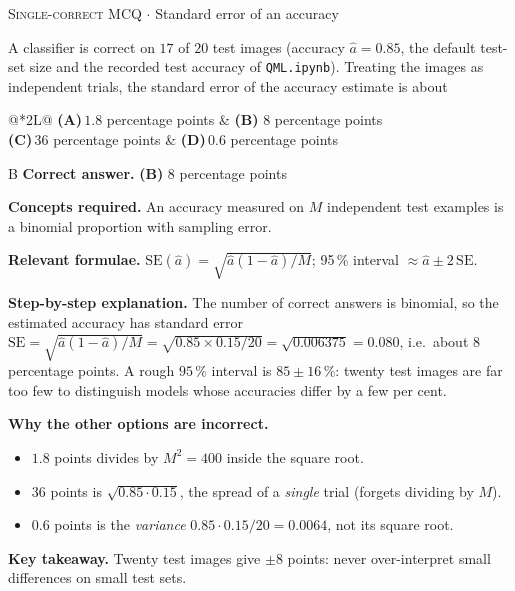 \documentclass[11pt,a4paper]{article}
\newcommand{\optlabel}[1]{\textbf{(#1)}}
\newcommand{\correctlabel}[1]{\textcolor{okgreen}{\textbf{(#1)}\,\ding{51}}}
\newenvironment{qitem}[1]{\begin{list}{}{\setlength{\leftmargin}{3.3em}\setlength{\labelwidth}{3.1em}%
  \setlength{\labelsep}{0.2em}\setlength{\topsep}{3pt}\setlength{\parsep}{3pt}}\item[\textbf{Q.#1}\hfill]}{\end{list}}
\newcommand{\qsep}{\par\vspace{2pt}{\color{black!15}\hrule}\vspace{4pt}}
\newcommand{\qmeta}[2]{{\footnotesize\color{black!60}\textsc{#1} \;$\cdot$\; #2}\par}
\begin{document}
\begin{qitem}{11}
\qmeta{Single-correct MCQ}{Standard error of an accuracy}
A classifier is correct on $17$ of $20$ test images (accuracy $\hat a = 0.85$, the default test-set size and the
recorded test accuracy of \texttt{QML.ipynb}). Treating the images as independent trials, the standard error of the
accuracy estimate is about
\par\smallskip\noindent\begin{tabularx}{\linewidth}{@{}*{2}{L}@{}}
\optlabel{A}\,$1.8$ percentage points & \correctlabel{B}\,$8$ percentage points \\[3pt]
\optlabel{C}\,$36$ percentage points & \optlabel{D}\,$0.6$ percentage points
\end{tabularx}
\end{qitem}
\begin{solbox}{B}
\textbf{\color{brand}Correct answer.} \textcolor{okgreen}{\textbf{(B)}} $8$ percentage points

\textbf{\color{brand}Concepts required.} An accuracy measured on $M$ independent test examples is a binomial proportion with sampling error.

\textbf{\color{brand}Relevant formulae.} $\mathrm{SE}(\hat a) = \sqrt{\hat a(1 - \hat a)/M}$; 95\,\% interval $\approx \hat a \pm 2\,\mathrm{SE}$.

\textbf{\color{brand}Step-by-step explanation.} The number of correct answers is binomial, so the estimated accuracy has standard error
$\mathrm{SE} = \sqrt{\hat a(1 - \hat a)/M} = \sqrt{0.85 \times 0.15/20} = \sqrt{0.006375} = 0.080$, i.e.\ about
$8$ percentage points. A rough $95\,\%$ interval is $85 \pm 16\,\%$: twenty test images are far too few to distinguish
models whose accuracies differ by a few per cent.

\textbf{\color{brand}Why the other options are incorrect.}
\begin{itemize}[leftmargin=2.4em, itemsep=1pt, topsep=2pt]
\item[\textbf{(A)}] $1.8$ points divides by $M^2 = 400$ inside the square root.
\item[\textbf{(C)}] $36$ points is $\sqrt{0.85\cdot0.15}$, the spread of a \emph{single} trial (forgets dividing by $M$).
\item[\textbf{(D)}] $0.6$ points is the \emph{variance} $0.85\cdot0.15/20 = 0.0064$, not its square root.
\end{itemize}
\textbf{\color{brand}Key takeaway.} Twenty test images give $\pm8$ points: never over-interpret small differences on small test sets.
\end{solbox}
\qsep
\end{document}
